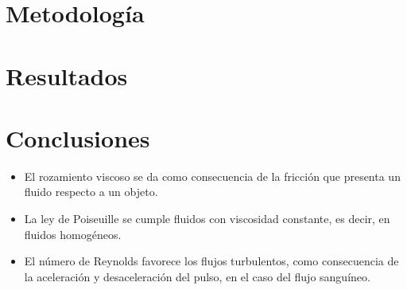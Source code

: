 \documentclass[osajnl,twocolumn,showpacs,superscriptaddress,10pt]{revtex4-2}
\begin{document}
\section{Metodología}


\section{Resultados}


\section{Conclusiones}
    \begin{itemize}
        \item El rozamiento viscoso se da como consecuencia de la fricción que presenta un fluido respecto a un objeto.
        \item La ley de Poiseuille se cumple fluidos con viscosidad constante, es decir, en fluidos homogéneos.
        \item El número de Reynolds favorece los flujos turbulentos, como consecuencia de la aceleración y desaceleración del pulso, en el caso del flujo sanguíneo.
    \end{itemize}
\end{document}
